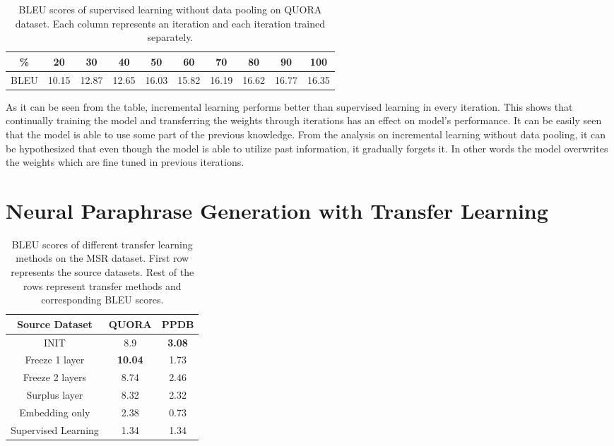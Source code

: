 \begin{table}[t]
\centering
\small
 \begin{tabular}{|c | c | c | c | c | c | c | c | c | c |} 
 \hline
 \% & 20 & 30 & 40 & 50 & 60 & 70 & 80 & 90 & 100 \\ [0.5ex] 
 \hline
  BLEU & 10.15 & 12.87 & 12.65 & 16.03 & 15.82 & 16.19 & 16.62 & 16.77 & 16.35  \\ 
 \hline
\end{tabular}
\caption{BLEU scores of supervised learning without data pooling on QUORA dataset. Each column represents an iteration and each iteration trained separately.}
\end{table}

As it can be seen from the table, incremental learning performs better than supervised learning in every iteration. This shows that continually training the model and transferring the weights through iterations has an effect on model's performance. It can be easily seen that the model is able to use some part of the previous knowledge. From the analysis on incremental learning without data pooling, it can be hypothesized that even though the model is able to utilize past information, it gradually forgets it. In other words the model overwrites the weights which are fine tuned in previous iterations.

\section{Neural Paraphrase Generation with Transfer Learning}

\begin{table}[t]
\centering
\small
 \begin{tabular}{|c | c | c |} 
 \hline
 Source Dataset & QUORA & PPDB \\ [0.5ex] 
 \hline
  INIT & 8.9 & \textbf{3.08}  \\ 
 \hline
  Freeze 1 layer & \textbf{10.04} & 1.73  \\ 
 \hline
  Freeze 2 layers & 8.74 & 2.46  \\ 
 \hline
  Surplus layer & 8.32 & 2.32  \\ 
 \hline
  Embedding only & 2.38 & 0.73  \\ 
 \hline
  Supervised Learning & 1.34 & 1.34  \\ 
 \hline
\end{tabular}
\caption{BLEU scores of different transfer learning methods on the MSR dataset. First row represents the source datasets. Rest of the rows represent transfer methods and corresponding BLEU scores.}
\end{table}


